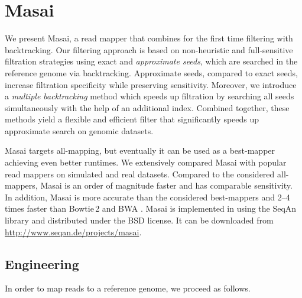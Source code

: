 \begin{landscape}
\begin{table}[h]
  \center
  \sffamily
	\renewcommand{\tabcolsep}{0.8ex}
	
\end{table}
\end{landscape}


\chapter{Masai}

We present Masai, a read mapper that combines for the first time filtering with backtracking.
Our filtering approach is based on non-heuristic and full-sensitive filtration strategies using exact and \emph{approximate seeds}, which are searched in the reference genome via backtracking.
Approximate seeds, compared to exact seeds, increase filtration specificity while preserving sensitivity.
Moreover, we introduce a \emph{multiple backtracking} method which speeds up filtration by searching all seeds simultaneously with the help of an additional index.
Combined together, these methods yield a flexible and efficient filter that significantly speeds up approximate search on genomic datasets.

Masai targets all-mapping, but eventually it can be used as a best-mapper achieving even better runtimes.
We extensively compared Masai with popular read mappers on simulated and real datasets.
Compared to the considered all-mappers, Masai is an order of magnitude faster and has comparable sensitivity.
In addition, Masai is more accurate than the considered best-mappers and 2--4 times faster than Bowtie\,2 \citep{Bowtie2} and BWA \citep{BWA}.
Masai is implemented in \CC using the SeqAn library and distributed under the BSD license.
It can be downloaded from \url{http://www.seqan.de/projects/masai}.


\section{Engineering}

In order to map reads to a reference genome, we proceed as follows.

